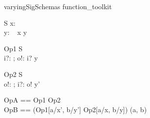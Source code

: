\begin{zsection}
\SECTION varyingSigSchemas \parents function\_toolkit
\end{zsection}

\begin{schema}{S}
   x: \nat \\
   y: \power~\nat
\where
   x \in y
\end{schema}

\begin{schema}{Op1}
  \Delta S \\
  i?: \nat; o!: \nat
\where
   i? \in y
\end{schema}

\begin{schema}{Op2}
  \Xi S \\
  o!: \nat; i?: \nat
\where
   o! \in y'
\end{schema}

\begin{zed}
   OpA == Op1 \semi Op2
\\
   OpB == (Op1[a/x', b/y'] \land Op2[a/x, b/y]) \hide (a, b)
\end{zed}